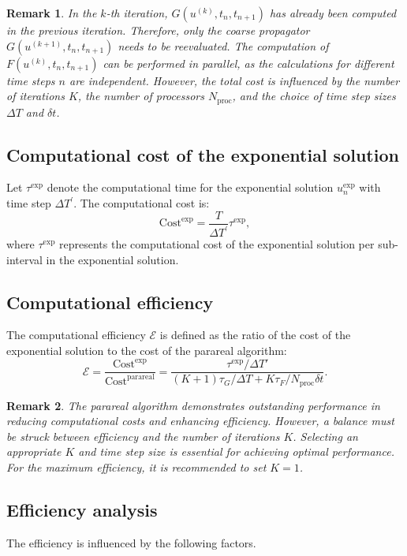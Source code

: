 \documentclass[preprint,12pt]{elsarticle}
\newtheorem{remark}{Remark}%
\begin{document}
	\begin{remark}
		In the $k$-th iteration, $G(u^{(k)}, t_n, t_{n+1})$ has already been computed in the previous iteration. Therefore, only the coarse propagator $G(u^{(k+1)}, t_n, t_{n+1})$ needs to be reevaluated. The computation of $F(u^{(k)}, t_n, t_{n+1})$ can be performed in parallel, as the calculations for different time steps $n$ are independent. However, the total cost is influenced by the number of iterations $K$, the number of processors  $N_{\text{proc}}$, and the choice of time step sizes $\Delta T$ and $\delta t$.
	\end{remark}
	
	\subsection{Computational cost of the exponential solution}
	Let $\tau^{\text{exp}}$ denote the computational time for the exponential solution $ u_n^{\text{exp}}$ with time step $\Delta T^{'}$. The computational cost is:
	\[
	\text{Cost}^{\text{exp}} = \frac{T}{\Delta T^{'}} \tau^{\text{exp}},
	\]
	where $\tau^{\text{exp}}$ represents the computational cost of the exponential solution per sub-interval in the exponential solution.
	
	\subsection{Computational efficiency}
	The computational efficiency $\mathcal{E}$ is defined as the ratio of the cost of the exponential solution to the cost of the parareal algorithm:
	\[
	\mathcal{E} = \frac{	\text{Cost}^{\text{exp}}}{\text{Cost}^{\text{parareal}}} = \frac{\tau^{\text{exp}} / \Delta T'}{(K + 1) \tau_G / \Delta T + K \tau_F /N_{\text{proc}} \delta t}.
	\]
	
	\begin{remark}
		The parareal algorithm demonstrates outstanding performance in reducing computational costs and enhancing efficiency. However, a balance must be struck between efficiency and the number of iterations $K$. Selecting an appropriate $K$ and time step size is essential for achieving optimal performance. For the maximum efficiency, it is recommended to set $K = 1$.
	\end{remark}
	
	\subsection{Efficiency analysis}
	The efficiency is influenced by the following factors.
	
\end{document}
